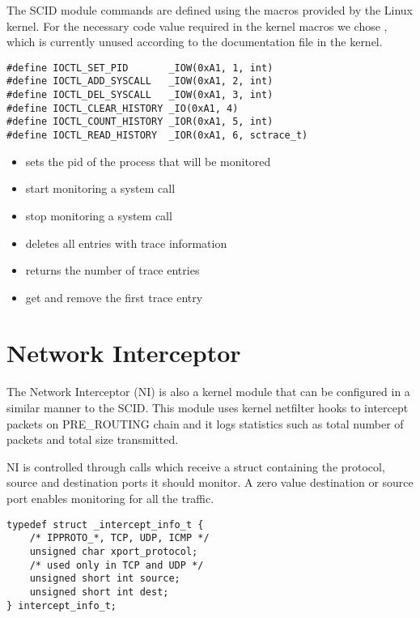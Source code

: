 The SCID module  commands are defined using the macros provided by the Linux kernel. For the necessary code value required in the kernel macros we chose , which is currently unused according to the documentation file in the kernel.

\lstset{language=C,caption=Command macros for ioctl,label=lst:scid-ioctl}
\begin{lstlisting}
#define IOCTL_SET_PID		_IOW(0xA1, 1, int)
#define IOCTL_ADD_SYSCALL	_IOW(0xA1, 2, int)
#define IOCTL_DEL_SYSCALL	_IOW(0xA1, 3, int)
#define IOCTL_CLEAR_HISTORY	_IO(0xA1, 4)
#define IOCTL_COUNT_HISTORY	_IOR(0xA1, 5, int)
#define IOCTL_READ_HISTORY	_IOR(0xA1, 6, sctrace_t)
\end{lstlisting}

\begin{itemize}
	\item {} sets the pid of the process that will be monitored
	\item {} start monitoring a system call
	\item {} stop monitoring a system call
	\item {} deletes all entries with trace information
	\item {} returns the number of trace entries
	\item {} get and remove the first trace entry
\end{itemize}

\section{Network Interceptor}
\label{fourth:ni}

The Network Interceptor (NI) is also a kernel module that can be configured in a similar manner to the SCID. This module uses kernel netfilter hooks to intercept packets on PRE_ROUTING chain and it logs statistics such as total number of packets and total size transmitted.

NI is controlled through  calls which receive a  struct containing the protocol, source and destination ports it should monitor. A zero value destination or source port enables monitoring for all the traffic.

\lstset{language=C,caption=parameter data structures,label=lst:param-struct}
\begin{lstlisting}
typedef struct _intercept_info_t {
	/* IPPROTO_*, TCP, UDP, ICMP */
	unsigned char xport_protocol;
	/* used only in TCP and UDP */
	unsigned short int source;
	unsigned short int dest;
} intercept_info_t;
\end{lstlisting}


